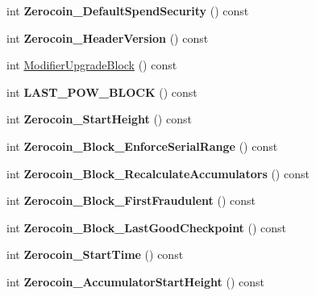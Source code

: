\begin{DoxyCompactItemize}
int {\bfseries Zerocoin\+\_\+\+Default\+Spend\+Security} () const
\item 
\mbox{\label{class_c_chain_params_afcf5e1e63110dc8242be2b631ead6f1e}} 
int {\bfseries Zerocoin\+\_\+\+Header\+Version} () const
\item 
int \mbox{\hyperlink{class_c_chain_params_ad166dbdd9631958fa0126e13dec1630a}{Modifier\+Upgrade\+Block}} () const
\item 
\mbox{\label{class_c_chain_params_a836847832c07d43f71d371aed259fb80}} 
int {\bfseries L\+A\+S\+T\+\_\+\+P\+O\+W\+\_\+\+B\+L\+O\+CK} () const
\item 
\mbox{\label{class_c_chain_params_a5c3b62573db5b5a6cdaee67d608353e0}} 
int {\bfseries Zerocoin\+\_\+\+Start\+Height} () const
\item 
\mbox{\label{class_c_chain_params_aed556aae7f3b194eb3d1699daa7d6b35}} 
int {\bfseries Zerocoin\+\_\+\+Block\+\_\+\+Enforce\+Serial\+Range} () const
\item 
\mbox{\label{class_c_chain_params_a4dcfed7f6d901fb89a5b77376e9d19f2}} 
int {\bfseries Zerocoin\+\_\+\+Block\+\_\+\+Recalculate\+Accumulators} () const
\item 
\mbox{\label{class_c_chain_params_a92c49924432a4786282ccfe32ecadf8a}} 
int {\bfseries Zerocoin\+\_\+\+Block\+\_\+\+First\+Fraudulent} () const
\item 
\mbox{\label{class_c_chain_params_a7d9e9fc154ad9bfc22f149a2a8903a9f}} 
int {\bfseries Zerocoin\+\_\+\+Block\+\_\+\+Last\+Good\+Checkpoint} () const
\item 
\mbox{\label{class_c_chain_params_ae921b3c9f58708e4a694bb0b1e42173a}} 
int {\bfseries Zerocoin\+\_\+\+Start\+Time} () const
\item 
\mbox{\label{class_c_chain_params_af514699e35ce971cebb03d19f937c320}} 
int {\bfseries Zerocoin\+\_\+\+Accumulator\+Start\+Height} () const
\end{DoxyCompactItemize}
